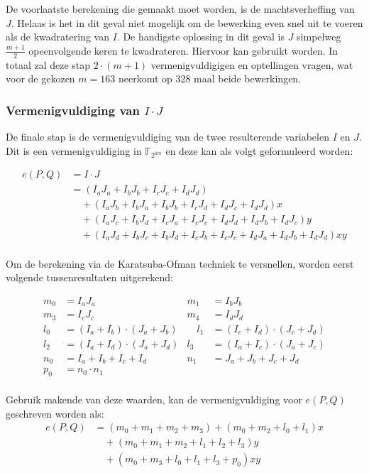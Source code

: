 De voorlaatste berekening die gemaakt moet worden, is de machtsverheffing van $J$. Helaas is het in dit geval niet mogelijk om de bewerking even snel uit te voeren als de kwadratering van $I$. De handigste oplossing in dit geval is $J$ simpelweg $\frac{m + 1}{2}$ opeenvolgende keren te kwadrateren. Hiervoor kan  gebruikt worden. In totaal zal deze stap $2 \cdot (m + 1)$ vermenigvuldigigen en optellingen vragen, wat voor de gekozen $m = 163$ neerkomt op 328 maal beide bewerkingen.

\subsubsection{Vermenigvuldiging van $I \cdot J$}

De finale stap is de vermenigvuldiging van de twee resulterende variabelen $I$ en $J$. Dit is een vermenigvuldiging in $\mathbb{F}_{2^{4m}}$ en deze kan als volgt geformuleerd worden:

\[\begin{aligned}
e(P, Q)	&= I \cdot J\\
	&= (I_a J_a + I_b J_b + I_c J_c + I_d J_d)\\
	&\quad + (I_a J_b + I_b J_a + I_b J_b + I_c J_d + I_d J_c + I_d J_d)x\\
	&\quad + (I_a J_c + I_b J_d + I_c J_a + I_c J_c + I_d J_d + I_d J_b + I_d J_c)y\\
	&\quad + (I_a J_d + I_b J_c + I_b J_d + I_c J_b + I_c J_c + I_d J_a + I_d J_b + I_d J_d)xy\\
\end{aligned}\]

Om de berekening via de Karatsuba-Ofman techniek te versnellen, worden eerst volgende tussenresultaten uitgerekend:

\[\begin{aligned}
m_0	&= I_a J_a
	&m_1	&= I_b J_b\\
m_3	&= I_c J_c
	&m_4	&= I_d J_d\\
l_0	&= (I_a + I_b) \cdot (J_a + J_b)
	&\quad l_1	&= (I_c + I_d) \cdot (J_c + J_d)\\
l_2	&= (I_a + I_d) \cdot (J_a + J_d)
	&l_3	&= (I_a + I_c) \cdot (J_a + J_c)\\
n_0	&= I_a + I_b + I_c + I_d
	&n_1	&= J_a + J_b + J_c + J_d\\
p_0	&= n_0 \cdot n_1\\
\end{aligned}\]

Gebruik makende van deze waarden, kan de vermenigvuldiging voor $e(P, Q)$ geschreven worden als:
\[\begin{aligned}
e(P, Q)	&= (m_0 + m_1 + m_2 + m_3) + (m_0 + m_2 + l_0 + l_1)x\\
	&\quad + (m_0 + m_1 + m_2 + l_1 + l_2 + l_3)y\\
	&\quad + (m_0 + m_3 + l_0 + l_1 + l_3 + p_0)xy\\
\end{aligned}\]

